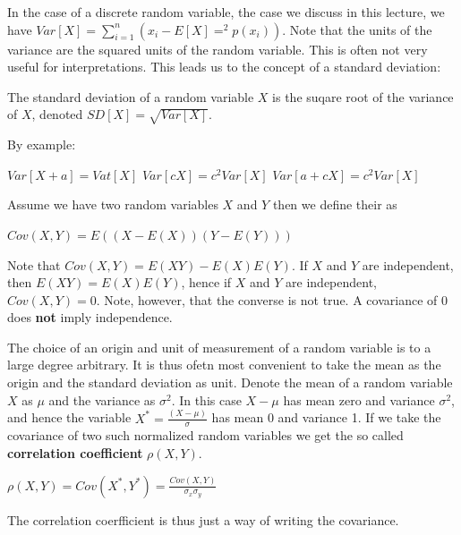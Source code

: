 \documentclass[
]{book}
\providecommand{\tightlist}{%
  \setlength{\itemsep}{0pt}\setlength{\parskip}{0pt}}
\begin{document}
In the case of a discrete random variable, the case we discuss in this lecture, we have
\(Var[X] = \sum_{i=1}^{n} (x_i - E[X]=^2 p(x_i))\). Note that the units of the variance are the
squared units of the random variable. This is often not very useful for interpretations. This
leads us to the concept of a standard deviation:

\begin{description}
\tightlist
\item[Standard Deviation]
The standard deviation of a random variable \(X\) is the suqare root of the variance of \(X\),
denoted \(SD[X] = \sqrt{Var[X]}\).
\end{description}

By example:

\(Var[X + a] = Vat[X]\)
\(Var[c X] = c^2 Var[X]\)
\(Var[a+ c X] = c^2Var[X]\)

Assume we have two random variables \(X\) and \(Y\) then we define their as

\begin{description}
\tightlist
\item[Covariance]
\(Cov(X,Y) = E((X - E(X))(Y-E(Y)))\)
\end{description}

Note that \(Cov(X,Y) = E(XY) - E(X)E(Y)\). If \(X\) and \(Y\) are independent, then \(E(XY) = E(X)E(Y)\),
hence if \(X\) and \(Y\) are independent, \(Cov(X,Y) = 0\). Note, however, that the converse is not true.
A covariance of 0 does \textbf{not} imply independence.

The choice of an origin and unit of measurement of a random variable is to a large
degree arbitrary. It is thus ofetn most convenient to take the mean as the origin and the
standard deviation as unit. Denote the mean of a random variable \(X\) as \(\mu\) and the variance as
\(\sigma^2\). In this case \(X-\mu\) has mean zero and variance \(\sigma^2\), and hence the variable
\(X^* = \frac{(X-\mu)}{\sigma}\) has mean 0 and variance 1. If we take the covariance
of two such normalized random variables we get the so called \textbf{correlation coefficient} \(\rho(X,Y)\).

\begin{description}
\tightlist
\item[Correlation Coefficient]
\(\rho(X,Y) = Cov(X^*,Y^*) = \frac{Cov(X,Y)}{\sigma_x \sigma_y}\)
\end{description}

The correlation coerfficient is thus just a way of writing the covariance.
\end{document}
